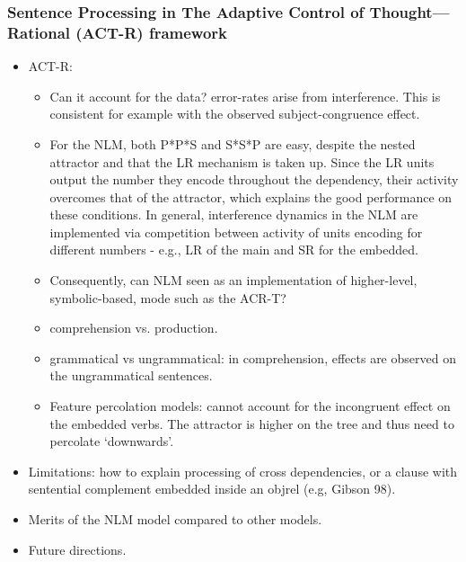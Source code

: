 \subsubsection{Sentence Processing in The Adaptive Control of Thought---Rational (ACT-R) framework}
\begin{itemize}
    \item ACT-R:
    \begin{itemize}    
         \item Can it account for the data? error-rates arise from interference. This is consistent for example with the observed subject-congruence effect. 
         \item For the NLM, both P*P*S and S*S*P are easy, despite the nested attractor and that the LR mechanism is taken up. Since the LR units output the number they encode throughout the dependency, their activity overcomes that of the attractor, which explains the good performance on these conditions. In general, interference dynamics in the NLM are implemented via competition between activity of units encoding for different numbers - e.g., LR of the main and SR for the embedded. 
         \item Consequently, can NLM seen as an implementation of higher-level, symbolic-based, mode such as the ACR-T?
    \end{itemize}

\begin{itemize}
    
    \item comprehension vs. production.
    
    \item grammatical vs ungrammatical: in comprehension, effects are observed on the ungrammatical sentences. 
      
        
        \item Feature percolation models: cannot account for the incongruent effect on the embedded verbs. The attractor is higher on the tree and thus need to percolate `downwards'.
    \end{itemize}   

    \item Limitations: how to explain processing of cross dependencies, or a clause with sentential complement embedded inside an objrel (e.g, Gibson 98).
    \item Merits of the NLM model compared to other models.    
    
    
    \item Future directions. 
    
\end{itemize}

